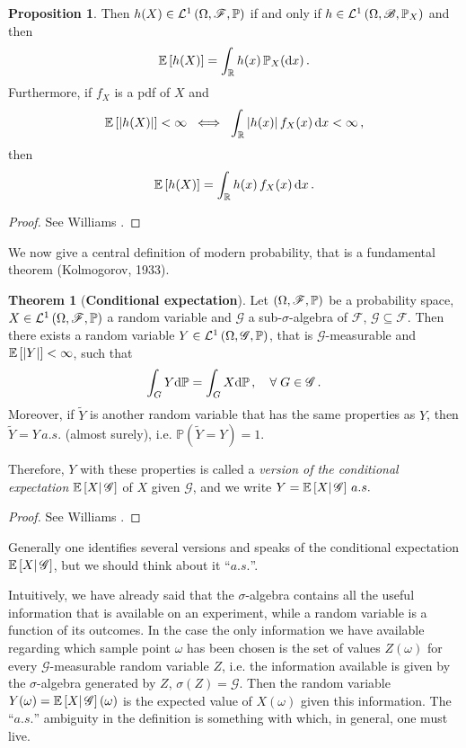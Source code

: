 \documentclass[10pt,a4paper]{book}
\theoremstyle{definition}
\newtheorem{prop}[defin]{Proposition}
\newtheorem{theorem}[defin]{Theorem}
\begin{document}
\begin{appendices}
\begin{prop}
\noindent  
Then $ h(X)\in\mathcal{L}^1\left(\Omega,\mathscr{F},\mathbb{P}\right)$ if and only if $h\in\mathcal{L}^1\left(\Omega,\mathscr{B},\mathbb{P}_X\right)$
and then
$$\mathbb{E}\left[h(X)\right]=\int_{\mathbb{R}}h(x)\,\mathbb{P}_X(\mbox{d} x)\,.$$
Furthermore, if $f_X$ is a pdf of $X$ and
\[
\mathbb{E}\left[|h(X)|\right]<\infty\;\iff\;\int_{\mathbb{R}}|h(x)|\,f_X(x)\,\mbox{d} x<\infty\,,
\] 
then
\[
\mathbb{E}\left[h(X)\right]=\int_{\mathbb{R}}h(x)\,f_X(x)\,\mbox{d} x\,.
\]
\end{prop}
\begin{proof}
 See Williams \cite[pp.~68-69]{Williams1991}.
\end{proof}

We now give a central definition of modern probability, that is a fundamental theorem (Kolmogorov, 1933).

\begin{theorem}[\textbf{Conditional expectation}]\label{Th:CondExp}
Let $\left(\Omega,\mathscr{F},\mathbb{P}\right)$ be a probability space, $X \in \mathcal{L}^1\left(\Omega,\mathscr{F},\mathbb{P}\right)$ a random variable and $\mathscr{G}$ a sub-$\sigma$-algebra of $\mathscr{F}$, $\mathscr{G}\subseteq\mathscr{F}$.
Then there exists a random variable $Y\in \mathcal{L}^1\left(\Omega,\mathscr{G},\mathbb{P}\right)$, that is $\mathscr{G}$-measurable and $\mathbb{E}\left[ \left| Y\right| \right]<\infty$, such that
$$
 \int_G Y\mbox{d}\mathbb{P} = \int_G X\mbox{d}\mathbb{P}\,,\quad \forall\;G\in\mathscr{G}\,.
$$
Moreover, if $\widetilde{Y}$ is another random variable that has the same properties as $Y$, then $\widetilde{Y}=Y\,a.s.$ (almost surely), i.e. $\mathbb{P}(\widetilde{Y}=Y)=1$.

\noindent
Therefore, $Y$ with these properties is called a \emph{version of the conditional expectation} $\mathbb{E}\left[ {X} \middle\vert {\,\mathscr{G}} \right]$ of $X$ given $\mathscr{G}$, and we write $Y=\mathbb{E}\left[ {X} \middle\vert {\,\mathscr{G}} \right]\,a.s.$
\end{theorem}
\begin{proof}
 See Williams \cite[pp.~85-86]{Williams1991}.
\end{proof}
\noindent
Generally one identifies several versions and speaks of the conditional expectation $\mathbb{E}\left[ {X} \middle\vert {\,\mathscr{G}} \right]$, but we should think about it ``$a.s.$''.

Intuitively, we have already said that the $\sigma$-algebra contains all the useful information that is available on an experiment, while a random variable is a function of its outcomes. In the case the only information we have available regarding which sample point $\omega$ has been chosen is the set of values $Z(\omega)$ for every $\mathscr{G}$-measurable random variable $Z$, i.e. the information available is given by the $\sigma$-algebra generated by $Z$, $\sigma(Z)=\mathscr{G}$. Then the random variable $Y(\omega)=\mathbb{E}\left[ {X} \middle\vert {\,\mathscr{G}} \right](\omega)$ is the expected value of $X(\omega)$ given this information. The ``$a.s.$'' ambiguity in the  definition is something with which, in general, one must live.
 

\end{appendices}
\end{document}
